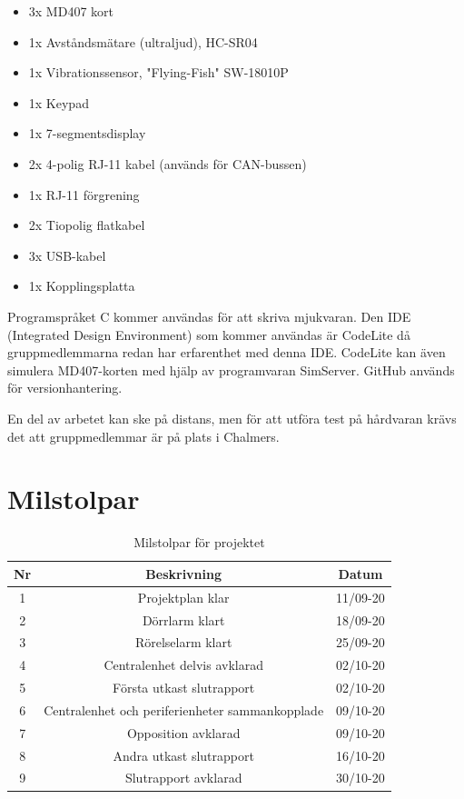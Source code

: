 \documentclass[a4paper]{article}
\begin{document}
\begin{itemize}
    \item 3x MD407 kort
    \item 1x Avståndsmätare (ultraljud), HC-SR04
    \item 1x Vibrationssensor, "Flying-Fish" SW-18010P
    \item 1x Keypad
    \item 1x 7-segmentsdisplay
    \item 2x 4-polig RJ-11 kabel (används för CAN-bussen)
    \item 1x RJ-11 förgrening
    \item 2x Tiopolig flatkabel
    \item 3x USB-kabel
    \item 1x Kopplingsplatta
\end{itemize}

Programspråket C kommer användas för att skriva mjukvaran. Den IDE (Integrated Design Environment) som kommer användas är CodeLite då gruppmedlemmarna redan har erfarenthet med denna IDE. CodeLite kan även simulera MD407-korten med hjälp av programvaran SimServer. GitHub används för versionhantering.

En del av arbetet kan ske på distans, men för att utföra test på hårdvaran krävs det att gruppmedlemmar är på plats i Chalmers.

\section{Milstolpar}


\begin{table}[H]
    \centering
        \begin{tabular}{ |c|c|c| }\hline
            Nr & Beskrivning & Datum \\\hline \hline
            1 & Projektplan klar & 11/09-20 \\\hline
            2 & Dörrlarm klart & 18/09-20 \\\hline
            3 & Rörelselarm klart & 25/09-20 \\\hline
            4 & Centralenhet delvis avklarad & 02/10-20 \\\hline
            5 & Första utkast slutrapport & 02/10-20 \\\hline
            6 & Centralenhet och periferienheter sammankopplade & 09/10-20 \\\hline
            7 & Opposition avklarad & 09/10-20 \\\hline
            8 & Andra utkast slutrapport & 16/10-20 \\\hline
            9 & Slutrapport avklarad & 30/10-20 \\\hline
        \end{tabular}
        \caption{Milstolpar för projektet}
        \label{table:milstolpar}
\end{table}
\end{document}
